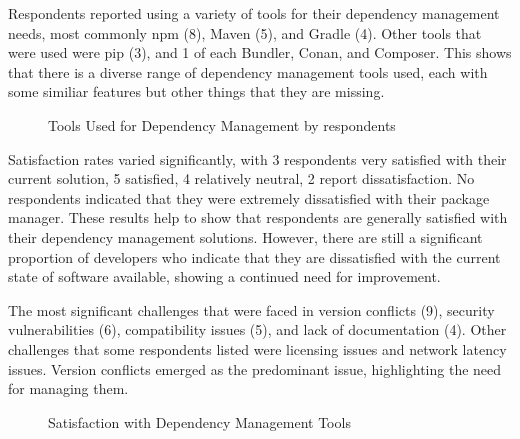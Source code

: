 \documentclass[sigconf]{acmart}
\begin{document}
Respondents reported using a variety of tools for their dependency management needs, most commonly npm (8), Maven (5), and Gradle (4). Other tools that were used were pip (3), and 1 of each Bundler, Conan, and Composer. This shows that there is a diverse range of dependency management tools used, each with some similiar features but other things that they are missing.

\begin{figure}[h]
	\centering
	\caption{Tools Used for Dependency Management by respondents}
	\label{fig:tools}
\end{figure}

Satisfaction rates varied significantly, with 3 respondents very satisfied with their current solution, 5 satisfied, 4 relatively neutral, 2 report dissatisfaction. No respondents indicated that they were extremely dissatisfied with their package manager. These results help to show that respondents are generally satisfied with their dependency management solutions. However, there are still a significant proportion of developers who indicate that they are dissatisfied with the current state of software available, showing a continued need for improvement.

The most significant challenges that were faced in version conflicts (9), security vulnerabilities (6), compatibility issues (5), and lack of documentation (4). Other challenges that some respondents listed were licensing issues and network latency issues. Version conflicts emerged as the predominant issue, highlighting the need for managing them.

\begin{figure}[h]
	\centering
	\caption{Satisfaction with Dependency Management Tools}
	\label{fig:satisfaction}
\end{figure}
\end{document}
